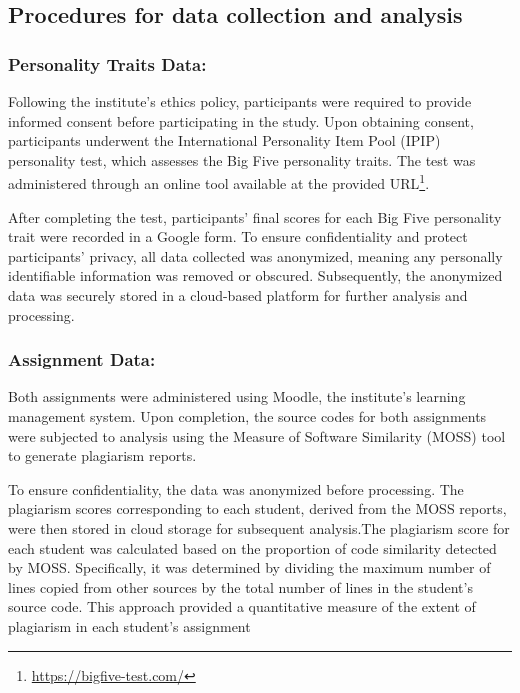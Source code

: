 \subsection{Procedures for data collection and analysis}
\subsubsection{Personality Traits Data:} Following the institute's ethics policy, participants were required to provide informed consent before participating in the study. Upon obtaining consent, participants underwent the International Personality Item Pool (IPIP) personality test, which assesses the Big Five personality traits. The test was administered through an online tool available at the provided URL\footnote{\url{https://bigfive-test.com/}}.

After completing the test, participants' final scores for each Big Five personality trait were recorded in a Google form. To ensure confidentiality and protect participants' privacy, all data collected was anonymized, meaning any personally identifiable information was removed or obscured. Subsequently, the anonymized data was securely stored in a cloud-based platform for further analysis and processing.

\subsubsection{Assignment Data:} 
Both assignments were administered using Moodle, the institute's learning management system. Upon completion, the source codes for both assignments were subjected to analysis using the Measure of Software Similarity (MOSS) tool to generate plagiarism reports.

To ensure confidentiality, the data was anonymized before processing. The plagiarism scores corresponding to each student, derived from the MOSS reports, were then stored in cloud storage for subsequent analysis.The plagiarism score for each student was calculated based on the proportion of code similarity detected by MOSS. Specifically, it was determined by dividing the maximum number of lines copied from other sources by the total number of lines in the student's source code. This approach provided a quantitative measure of the extent of plagiarism in each student's assignment






